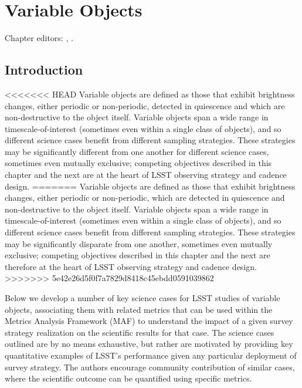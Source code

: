 
\chapter[Variable Objects]{Variable Objects}
\def\chpname{variables}\label{chp:\chpname}

Chapter editors:
,
.




\section{Introduction}

<<<<<<< HEAD
Variable objects are defined as those that exhibit brightness changes, either periodic or non-periodic, detected in quiescence and which are non-destructive to the object itself. Variable objects span a wide range in timescale-of-interest (sometimes even within a single class of objects), and so different science cases benefit from different sampling strategies. These strategies may be significantly different from one another for different science cases, sometimes even mutually exclusive; competing objectives described in this chapter and the next are at the heart of LSST observing strategy and cadence design.
=======
Variable objects are defined as those that exhibit brightness changes, either periodic or non-periodic, which are detected in quiescence and non-destructive to the object itself. Variable objects span a wide range in timescale-of-interest (sometimes even within a single class of objects), and so different science cases benefit from different sampling strategies. These strategies may be significantly disparate from one another, sometimes even mutually exclusive; competing objectives described in this chapter and the next are therefore at the heart of LSST observing strategy and cadence design.
>>>>>>> 5e42e26d5f0f7a7829d8418c45ebdd0591039862

Below we develop a number of key science cases for LSST studies of variable objects, associating them with related metrics that can be used within the Metrics Analysis Framework (MAF) to understand the impact of a given survey strategy realization on the scientific results for that case. The science cases outlined are by no means exhaustive, but rather are motivated by providing key quantitative examples of LSST's performance given any particular deployment of survey strategy. The authors encourage community contribution of similar cases, where the scientific outcome can be quantified using specific metrics. 




